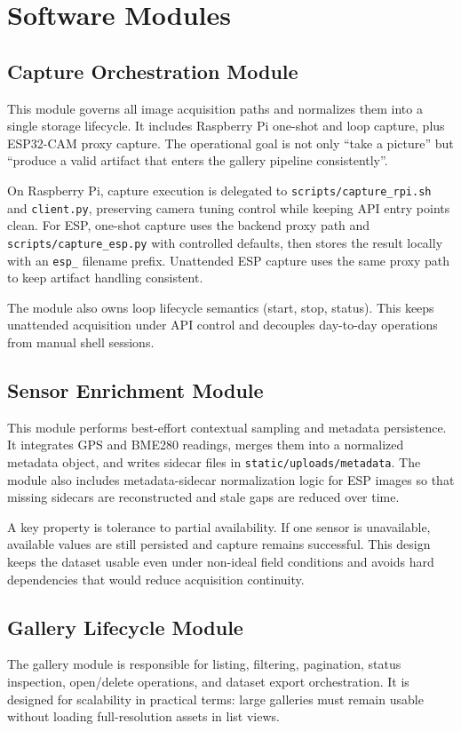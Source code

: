 \section{Software Modules}

\subsection{Capture Orchestration Module}
This module governs all image acquisition paths and normalizes them into a single storage lifecycle. It includes Raspberry Pi one-shot and loop capture, plus ESP32-CAM proxy capture. The operational goal is not only ``take a picture'' but ``produce a valid artifact that enters the gallery pipeline consistently''.

On Raspberry Pi, capture execution is delegated to \texttt{scripts/capture\_rpi.sh} and \texttt{client.py}, preserving camera tuning control while keeping API entry points clean. For ESP, one-shot capture uses the backend proxy path and \texttt{scripts/capture\_esp.py} with controlled defaults, then stores the result locally with an \texttt{esp\_} filename prefix. Unattended ESP capture uses the same proxy path to keep artifact handling consistent.

The module also owns loop lifecycle semantics (start, stop, status). This keeps unattended acquisition under API control and decouples day-to-day operations from manual shell sessions.

\subsection{Sensor Enrichment Module}
This module performs best-effort contextual sampling and metadata persistence. It integrates GPS and BME280 readings, merges them into a normalized metadata object, and writes sidecar files in \texttt{static/uploads/metadata}. The module also includes metadata-sidecar normalization logic for ESP images so that missing sidecars are reconstructed and stale gaps are reduced over time.

A key property is tolerance to partial availability. If one sensor is unavailable, available values are still persisted and capture remains successful. This design keeps the dataset usable even under non-ideal field conditions and avoids hard dependencies that would reduce acquisition continuity.

\subsection{Gallery Lifecycle Module}
The gallery module is responsible for listing, filtering, pagination, status inspection, open/delete operations, and dataset export orchestration. It is designed for scalability in practical terms: large galleries must remain usable without loading full-resolution assets in list views.

